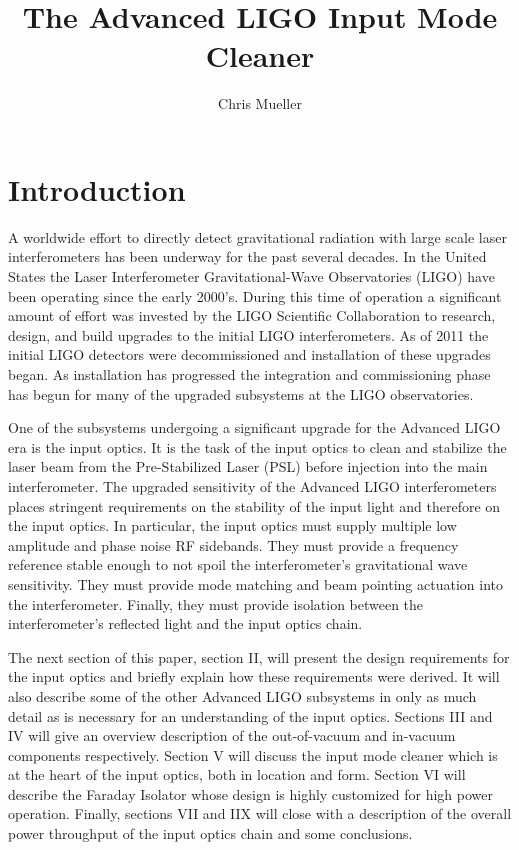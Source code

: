 \documentclass[10pt]{article}
\title{The Advanced LIGO Input Mode Cleaner}
\author{Chris Mueller}
\begin{document}
\section{Introduction}

A worldwide effort to directly detect gravitational radiation with large scale laser interferometers 
has been underway for the past several decades.  
In the United States the Laser Interferometer Gravitational-Wave Observatories (LIGO) have been operating
since the early 2000's.  
During this time of operation a significant amount of effort was invested by the LIGO Scientific Collaboration 
to research, design, and build upgrades to the initial LIGO interferometers.  
As of 2011 the initial LIGO detectors were decommissioned and installation of these upgrades began.  
As installation has progressed the integration and commissioning phase has begun for many of the 
upgraded subsystems at the LIGO observatories.  

One of the subsystems undergoing a significant upgrade for the Advanced LIGO era is 
the input optics.  
It is the task of the input optics to clean and stabilize the laser beam from the 
Pre-Stabilized Laser (PSL) before injection into the main interferometer.  
The upgraded sensitivity of the Advanced LIGO interferometers places stringent requirements on 
the stability of the input light and therefore on the input optics.  
In particular, the input optics must supply multiple low amplitude and phase noise RF sidebands.  
They must provide a frequency reference stable enough to not spoil the interferometer's 
gravitational wave sensitivity.  
They must provide mode matching and beam pointing actuation into the interferometer.  
Finally, they must provide isolation between the interferometer's reflected light and the 
input optics chain.  

The next section of this paper, section II, will present the design requirements for the input optics and 
briefly explain how these requirements were derived.  
It will also describe some of the other Advanced LIGO subsystems in only as much detail as 
is necessary for an understanding of the input optics.  
Sections III and IV will give an overview description of the out-of-vacuum and in-vacuum 
components respectively.  
Section V will discuss the input mode cleaner which is at the heart of the input optics, 
both in location and form.  
Section VI will describe the Faraday Isolator whose design is highly customized for high power 
operation.  
Finally, sections VII and IIX will close with a description of the overall power throughput of the 
input optics chain and some conclusions.  
\end{document}
